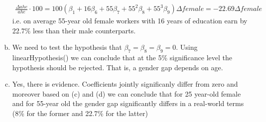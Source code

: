 \documentclass[a4paper]{article}
\begin{document}
\begin{enumerate}[a.]
\begin{align*}
	\frac{\Delta ahe}{ahe} \cdot 100 = 100(\beta_1 + 16 \beta_6 + 55 \beta_7 + 55^2 \beta_8 + 55^3 \beta_9)\Delta female = -22.69 \Delta female
	\end{align*}
	i.e. on average 55-year old female workers with 16 years of education earn by 22.7\% less than their male counterparts.
	\item We need to test the hypothesis that $\beta_7 = \beta_8 = \beta_9 = 0$. Using linearHypothesis() we can conclude that at the 5\% significance level the hypothesis should be rejected. That is, a gender gap depends on age.
	\item Yes, there is evidence. Coefficients jointly significanly differ from zero and moreover based on (c) and (d) we can conclude that for 25 year-old female and for 55-year old the gender gap significantly differs in a real-world terms (8\% for the former and 22.7\% for the latter)
\end{enumerate}
\end{document}
